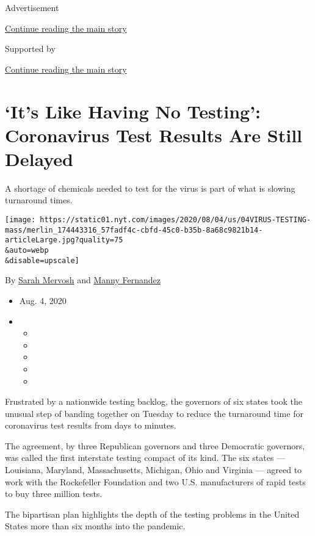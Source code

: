 Advertisement

\protect\hyperlink{after-top}{Continue reading the main story}

Supported by

\protect\hyperlink{after-sponsor}{Continue reading the main story}

\hypertarget{its-like-having-no-testing-coronavirus-test-results-are-still-delayed}{%
\section{`It's Like Having No Testing': Coronavirus Test Results Are
Still
Delayed}\label{its-like-having-no-testing-coronavirus-test-results-are-still-delayed}}

A shortage of chemicals needed to test for the virus is part of what is
slowing turnaround times.

\texttt{[image: https://static01.nyt.com/images/2020/08/04/us/04VIRUS-TESTING-mass/merlin\_174443316\_57fadf4c-cbfd-45c0-b35b-8a68c9821b14-articleLarge.jpg?quality=75\\\&auto=webp\\\&disable=upscale]}

By \href{https://www.nytimes.com/by/sarah-mervosh}{Sarah Mervosh} and
\href{https://www.nytimes.com/by/manny-fernandez}{Manny Fernandez}

\begin{itemize}
\item
  Aug. 4, 2020
\item
  \begin{itemize}
  \item
  \item
  \item
  \item
  \item
  \end{itemize}
\end{itemize}

Frustrated by a nationwide testing backlog, the governors of six states
took the unusual step of banding together on Tuesday to reduce the
turnaround time for coronavirus test results from days to minutes.

The agreement, by three Republican governors and three Democratic
governors, was called the first interstate testing compact of its kind.
The six states --- Louisiana, Maryland, Massachusetts, Michigan, Ohio
and Virginia --- agreed to work with the Rockefeller Foundation and two
U.S. manufacturers of rapid tests to buy three million tests.

The bipartisan plan highlights the depth of the testing problems in the
United States more than six months into the pandemic.

